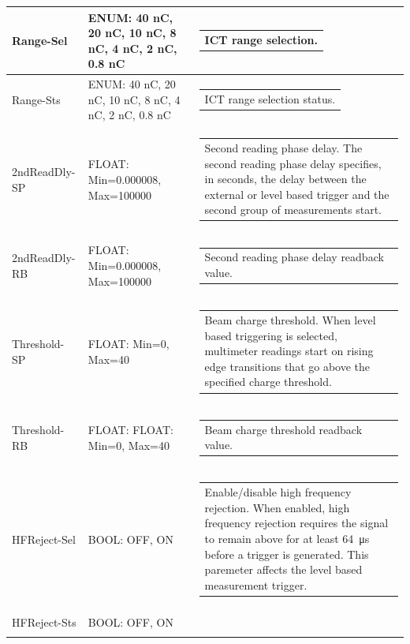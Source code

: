 \documentclass[openany]{article}
\begin{document}
\begin{longtable}{| m{3.0cm} m{4.5cm} m{7.0cm} |}
		Range-Sel & ENUM: 40 nC, 20 nC, 10 nC, 8 nC, 4 nC, 2 nC, 0.8 nC & \begin{tabular}{@{}m{6cm}@{}}
	    					ICT range selection.
						\end{tabular} \\ \hline
		Range-Sts & ENUM: 40 nC, 20 nC, 10 nC, 8 nC, 4 nC, 2 nC, 0.8 nC & \begin{tabular}{@{}m{6cm}@{}}
	    					ICT range selection status.
						\end{tabular} \\ \hline
		2ndReadDly-SP & FLOAT: Min=0.000008, Max=100000 & \begin{tabular}{@{}m{6cm}@{}}
	    					Second reading phase delay. The second reading phase delay specifies, in seconds, the delay between the external or level based trigger and the second group of measurements start.
						\end{tabular} \\ \hline
		2ndReadDly-RB & FLOAT: Min=0.000008, Max=100000 & \begin{tabular}{@{}m{6cm}@{}}
	    					Second reading phase delay readback value.
						\end{tabular} \\ \hline
		Threshold-SP & FLOAT: Min=0, Max=40 & \begin{tabular}{@{}m{6cm}@{}}
	    					Beam charge threshold. When level based triggering is selected, multimeter readings start on rising edge transitions that go above the specified charge threshold.
						\end{tabular} \\ \hline
		Threshold-RB & FLOAT: FLOAT: Min=0, Max=40 & \begin{tabular}{@{}m{6cm}@{}}
	    					Beam charge threshold readback value.
						\end{tabular} \\ \hline
		HFReject-Sel & BOOL: OFF, ON & \begin{tabular}{@{}m{6cm}@{}}
	    					Enable/disable high frequency rejection. When enabled, high frequency rejection requires the signal to remain above for at least \SI{64}{\micro\second} before a trigger is generated. This paremeter affects the level based measurement trigger.
						\end{tabular} \\ \hline
		HFReject-Sts & BOOL: OFF, ON & \begin{tabular}{@{}m{6cm}@{}}

\end{tabular}
\end{longtable}
\end{document}
